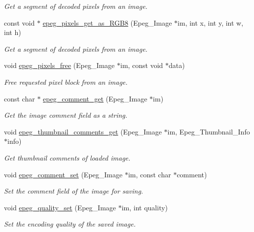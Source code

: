 \begin{DoxyCompactItemize}
\begin{DoxyCompactList}\small\item\em Get a segment of decoded pixels from an image. \end{DoxyCompactList}\item 
const void $\ast$ \hyperlink{epeg_8c_a2dee06509f945c8e56efe30975e77806}{epeg\-\_\-pixels\-\_\-get\-\_\-as\-\_\-\-R\-G\-B8} (Epeg\-\_\-\-Image $\ast$im, int x, int y, int w, int h)
\begin{DoxyCompactList}\small\item\em Get a segment of decoded pixels from an image. \end{DoxyCompactList}\item 
void \hyperlink{epeg_8c_adf9efc5d877afebda99aba8d5c2bbb0f}{epeg\-\_\-pixels\-\_\-free} (Epeg\-\_\-\-Image $\ast$im, const void $\ast$data)
\begin{DoxyCompactList}\small\item\em Free requested pixel block from an image. \end{DoxyCompactList}\item 
const char $\ast$ \hyperlink{epeg_8c_ab4aea6482399797f2f4ada02e9962b7f}{epeg\-\_\-comment\-\_\-get} (Epeg\-\_\-\-Image $\ast$im)
\begin{DoxyCompactList}\small\item\em Get the image comment field as a string. \end{DoxyCompactList}\item 
void \hyperlink{epeg_8c_a28e230b7b3bb05b8a470c80c45100c52}{epeg\-\_\-thumbnail\-\_\-comments\-\_\-get} (Epeg\-\_\-\-Image $\ast$im, Epeg\-\_\-\-Thumbnail\-\_\-\-Info $\ast$info)
\begin{DoxyCompactList}\small\item\em Get thumbnail comments of loaded image. \end{DoxyCompactList}\item 
void \hyperlink{epeg_8c_ab96605b1c21ec8d791df705a5117233c}{epeg\-\_\-comment\-\_\-set} (Epeg\-\_\-\-Image $\ast$im, const char $\ast$comment)
\begin{DoxyCompactList}\small\item\em Set the comment field of the image for saving. \end{DoxyCompactList}\item 
void \hyperlink{epeg_8c_ad0c11f61561f622ca4097c47c75129bc}{epeg\-\_\-quality\-\_\-set} (Epeg\-\_\-\-Image $\ast$im, int quality)
\begin{DoxyCompactList}\small\item\em Set the encoding quality of the saved image. \end{DoxyCompactList}\item 

\end{DoxyCompactItemize}
